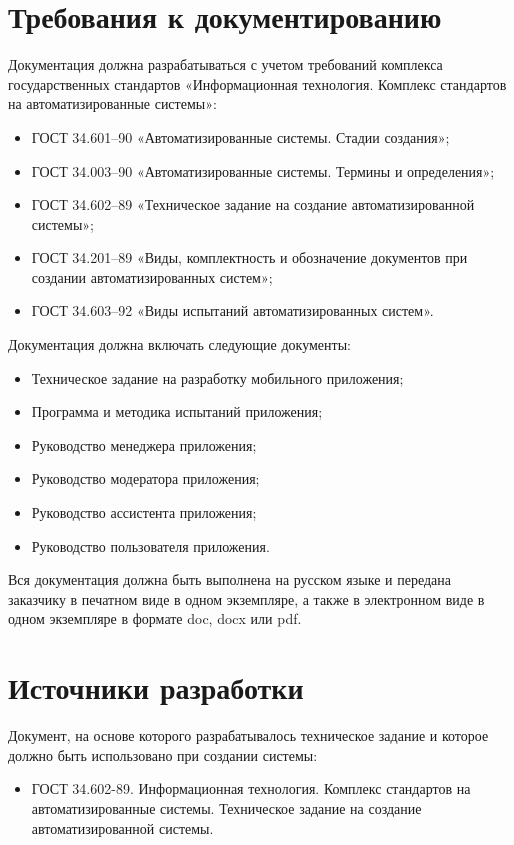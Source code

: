 \documentclass[14pt]{extreport}
\begin{document}
\newpage
\section{Требования к документированию}
Документация должна разрабатываться с учетом требований комплекса государственных стандартов «Информационная технология. Комплекс стандартов на автоматизированные системы»:
\begin{itemize}
	\item ГОСТ 34.601–90 «Автоматизированные системы. Стадии создания»;
	\item ГОСТ 34.003–90 «Автоматизированные системы. Термины и определения»;
	\item ГОСТ 34.602–89 «Техническое задание на создание автоматизированной системы»;
	\item ГОСТ 34.201–89 «Виды, комплектность и обозначение документов при создании автоматизированных систем»;
	\item ГОСТ 34.603–92 «Виды испытаний автоматизированных систем».
\end{itemize}

Документация должна включать следующие документы:
\begin{itemize}
	\item Техническое задание на разработку мобильного приложения;
	\item Программа и методика испытаний приложения;
	\item Руководство менеджера приложения;
	\item Руководство модератора приложения;
	\item Руководство ассистента приложения;
	\item Руководство пользователя приложения.
\end{itemize}

Вся документация должна быть выполнена на русском языке и передана заказчику в печатном виде в одном экземпляре, а также в электронном виде в одном экземпляре в формате doc, docx или pdf.

\newpage
\section{Источники разработки}
Документ, на основе которого разрабатывалось техническое задание и которое должно быть использовано при создании системы:
\begin{itemize}
	\item ГОСТ 34.602-89. Информационная технология. Комплекс стандартов на автоматизированные системы. Техническое задание на создание автоматизированной системы.
\end{itemize}
\end{document}
